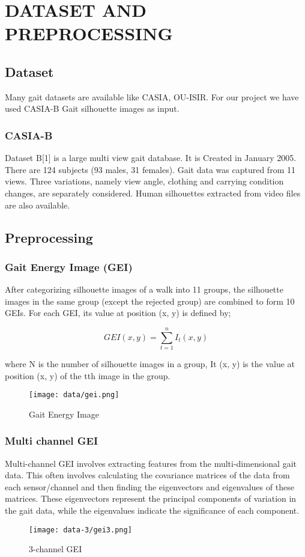 \chapter{DATASET AND PREPROCESSING}
\graphicspath{{Chapter2/}}

\section{Dataset}

Many gait datasets are available like CASIA, OU-ISIR. For our project we have used CASIA-B Gait silhouette images as input.

\subsection{CASIA-B}
Dataset B[1] is a large multi view gait database. It is Created in January 2005. There are 124 subjects (93 males, 31 females). Gait data was captured from 11 views. Three variations, namely view angle, clothing and carrying condition changes, are separately considered. Human silhouettes extracted from video files are also available.\cite{shiqi2006}

\section{Preprocessing}

\subsection{Gait Energy Image (GEI)}

After categorizing silhouette images of a walk into 11 groups, the silhouette images in the same group (except the rejected group) are combined to form 10 GEIs. For each GEI, its value at position (x, y) is defined by;

$$ GEI(x, y) = \sum_{t=1}^{n} I_t(x, y) $$

where N is the number of silhouette images in a group, It (x, y) is the value at position (x, y) of the tth image in the group.
\begin{figure}[ht]
    \centering
    \texttt{[image: data/gei.png]}
    \caption{Gait Energy Image}
    \label{fig:gei}
\end{figure}

\subsection{Multi channel GEI}
Multi-channel GEI involves extracting features from the multi-dimensional gait data. This often involves calculating the covariance matrices of the data from each sensor/channel and then finding the eigenvectors and eigenvalues of these matrices. These eigenvectors represent the principal components of variation in the gait data, while the eigenvalues indicate the significance of each component.\cite{kitchat2019}

\begin{figure}[ht]
    \centering
    \texttt{[image: data-3/gei3.png]}
    \caption{3-channel GEI}
    \label{fig:gei-3}
\end{figure}
